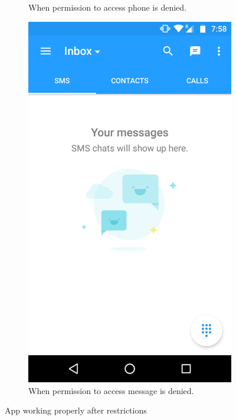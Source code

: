 \begin{figure}[h]
\begin{subfigure}[h]{0.45\textwidth}
		\caption{When permission to access phone is denied.}
	\end{subfigure}
	\hfill
	\begin{subfigure}[h]{0.45\textwidth}
		\centering
		\includegraphics[width=\textwidth]{restrict_sol2.png}
		\caption{When permission to access message is denied.}
	\end{subfigure}
	\caption{App working properly after restrictions}
	\label{fig:prob2}
\end{figure}

